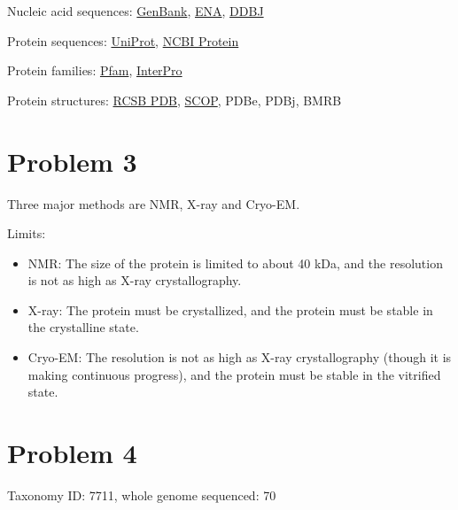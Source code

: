 \documentclass{article}
\begin{document}
Nucleic acid sequences: \href{https://www.ncbi.nlm.nih.gov/genbank/}{GenBank}, \href{https://www.ebi.ac.uk/ena/browser/home}{ENA}, \href{https://www.ddbj.nig.ac.jp/index-e.html}{DDBJ}

Protein sequences: \href{https://www.uniprot.org/}{UniProt}, \href{https://www.ncbi.nlm.nih.gov/protein/}{NCBI Protein}

Protein families: \href{http://pfam.xfam.org/}{Pfam}, \href{https://www.ebi.ac.uk/interpro/}{InterPro}

Protein structures: \href{https://www.rcsb.org/}{RCSB PDB}, \href{https://www.ebi.ac.uk/pdbe/scop/}{SCOP}, PDBe, PDBj, BMRB

\section{Problem 3}

Three major methods are NMR, X-ray and Cryo-EM.

Limits:

\begin{itemize}
    \item NMR: The size of the protein is limited to about 40 kDa, and the resolution is not as high as X-ray crystallography.
    \item X-ray: The protein must be crystallized, and the protein must be stable in the crystalline state.
    \item Cryo-EM: The resolution is not as high as X-ray crystallography (though it is making continuous progress), and the protein must be stable in the vitrified state.
\end{itemize}

\section{Problem 4}
Taxonomy ID: 7711, whole genome sequenced: 70
\end{document}
